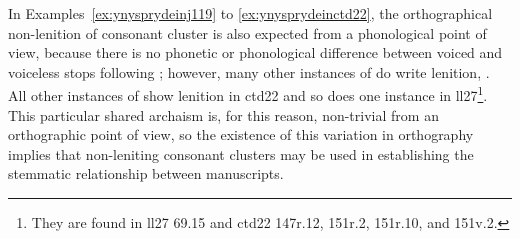 In Examples~\ref{ex:ynysprydeinj119} to \ref{ex:ynysprydeinctd22}, the orthographical non-lenition of  consonant cluster  is also expected from a phonological point of view, because there is no phonetic or phonological difference between voiced and voiceless stops following ; however, many other instances of  do write lenition, \ie {}. All other instances of   show lenition in \gls{ctd22} and so does one instance in \gls{ll27}\footnote{They are found in \gls{ll27} 69.15 and \gls{ctd22} 147r.12, 151r.2, 151r.10, and 151v.2.}. This particular shared archaism is, for this reason, non-trivial from an orthographic point of view, so the existence of this variation in orthography implies that non-leniting consonant clusters may be used in establishing the stemmatic relationship between  manuscripts. 
\begin{mwl}
\end{mwl}


